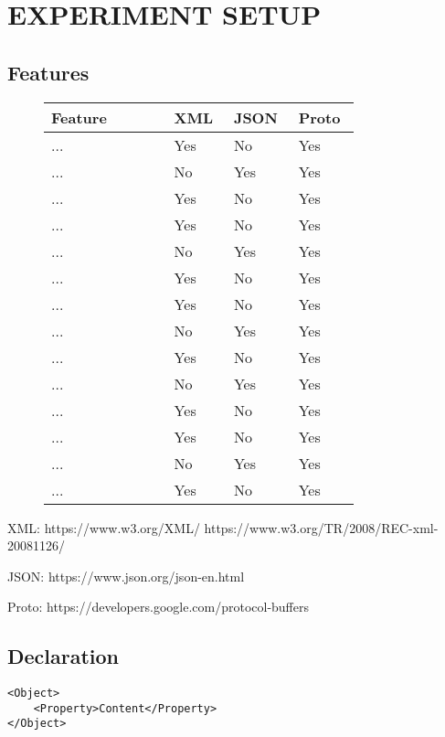 \documentclass[../report.tex]{subfiles}
\begin{document}
\section{EXPERIMENT SETUP} %

\subsection{Features}

\begin{figure}[H]
\def\arraystretch{1.5}
\begin{tabular}{|p{0.35\linewidth}|p{0.15\linewidth}|p{0.15\linewidth}|p{0.15\linewidth}|}
\hline
Feature & XML & JSON & Proto \\
\hline
... & Yes & No & Yes \\ 
... & No & Yes & Yes \\ 
... & Yes & No & Yes \\ 
... & Yes & No & Yes \\ 
... & No & Yes & Yes \\ 
... & Yes & No & Yes \\ 
... & Yes & No & Yes \\ 
... & No & Yes & Yes \\ 
... & Yes & No & Yes \\ 
... & No & Yes & Yes \\ 
... & Yes & No & Yes \\ 
... & Yes & No & Yes \\ 
... & No & Yes & Yes \\ 
... & Yes & No & Yes \\ 
\hline
\end{tabular}
\end{figure}

XML: https://www.w3.org/XML/ https://www.w3.org/TR/2008/REC-xml-20081126/

JSON: https://www.json.org/json-en.html

Proto: https://developers.google.com/protocol-buffers

\subsection{Declaration}

\begin{Verbatim}[frame=single,numbers=right,framesep=5mm,label=XML Object]
<Object>
    <Property>Content</Property>
</Object>
\end{Verbatim}
\end{document}
